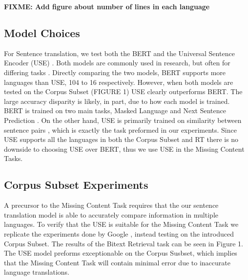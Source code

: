 \documentclass[11pt]{article}
\newcommand{\fixme}[1]{\textbf{FIXME: {#1}}}
\begin{document}
\fixme{Add figure about number of lines in each language}

\subsection{Model Choices}
For Sentence translation, we test both the BERT\cite{Citation Needed} and the Universal Sentence Encoder (USE) \cite{Citation Needed}. Both models are commonly used in research, but often for differing tasks \cite{Citation Needed}. Directly comparing the two models, BERT supports more languages than USE, 104 to 16 respectively. However, when both models are tested on the Corpus Subset (FIGURE 1) USE clearly outperforms BERT. The large accuracy disparity is likely, in part, due to how each model is trained. BERT is trained on two main tasks, Masked Language and Next Sentence Prediction \cite{Citation Needed}. On the other hand, USE is primarily trained on similarity between sentence pairs \cite{Citation Needed}, which is exactly the task preformed in our experiments. Since USE supports all the languages in both the Corpus Subset and RT there is no downside to choosing USE over BERT, thus we use USE in the Missing Content Tasks. 


\subsection{Corpus Subset Experiments}
A precursor to the Missing Content Task requires that the our sentence translation model is able to accurately compare information in multiple languages. To verify that the USE is suitable for the Missing Content Task we replicate the experiments done by Google \cite{Citation Needed}, instead testing on the introduced Corpus Subset. The results of the Bitext Retrieval task can be seen in Figure 1. The USE model preforms exceptionable on the Corpus Susbset, which implies that the Missing Content Task will contain minimal error due to inaccurate language translations.  



\end{document}
